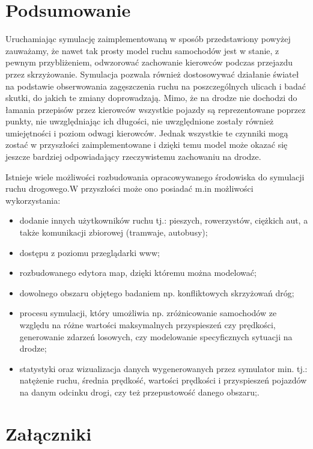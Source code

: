 \documentclass{sprawozdanie-agh}
\begin{document}
	\section{Podsumowanie}

	Uruchamiając symulację zaimplementowaną w sposób przedstawiony powyżej zauważamy, że nawet tak prosty model ruchu samochodów jest w stanie, z pewnym przybliżeniem, odwzorować zachowanie kierowców podczas przejazdu przez skrzyżowanie. Symulacja pozwala również dostosowywać działanie świateł na podstawie obserwowania zagęszczenia ruchu na poszczególnych ulicach i badać skutki, do jakich te zmiany doprowadzają. Mimo, że na drodze nie dochodzi do łamania przepisów przez kierowców wszystkie pojazdy są reprezentowane poprzez punkty, nie uwzględniając ich długości, nie uwzględnione zostały również umiejętności i poziom odwagi kierowców. Jednak wszystkie te czynniki mogą zostać w przyszłości zaimplementowane i dzięki temu model może okazać się jeszcze bardziej odpowiadający rzeczywistemu zachowaniu na drodze.

	Istnieje wiele możliwości rozbudowania opracowywanego środowiska do symulacji ruchu drogowego.W przyszłości może ono posiadać m.in możliwości wykorzystania:
	\begin{itemize}
		\item dodanie innych użytkowników ruchu tj.: pieszych, rowerzystów, ciężkich aut, a także komunikacji zbiorowej (tramwaje, autobusy);
		\item dostępu z poziomu przeglądarki www;
		\item rozbudowanego  edytora map, dzięki któremu można modelować;
		\item dowolnego obszaru objętego badaniem np. konfliktowych skrzyżowań dróg;
		\item procesu symulacji, który umożliwia np. zróżnicowanie samochodów ze względu na różne wartości maksymalnych przyspieszeń czy prędkości, generowanie zdarzeń losowych, czy modelowanie specyficznych sytuacji na drodze;
		\item statystyki oraz wizualizacja danych wygenerowanych przez symulator min. tj.: natężenie ruchu, średnia prędkość, wartości prędkości i przyspieszeń pojazdów na danym odcinku drogi, czy też przepustowość danego obszaru;.
	\end{itemize}

	\newpage
	\section{Załączniki}
\end{document}
